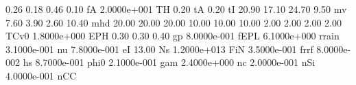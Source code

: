 0.26 0.18 0.46 0.10 fA
2.0000e+001    TH
0.20           tA
0.20           tI
20.90 17.10 24.70 9.50 mv 
7.60 3.90 2.60 10.40         mhd
20.00 20.00 20.00 10.00 10.00 10.00 2.00 2.00 2.00 2.00  TCv0
1.8000e+000   EPH
0.30 0.30 0.40 gp
8.0000e-001  fEPL
6.1000e+000 rrain
3.1000e-001    nu
7.8000e-001    eI
13.00          Ns
1.2000e+013   FiN
3.5000e-001  frrf
8.0000e-002    hs
8.7000e-001  phi0
2.1000e-001   gam
2.4000e+000    nc
2.0000e-001   nSi
4.0000e-001   nCC

